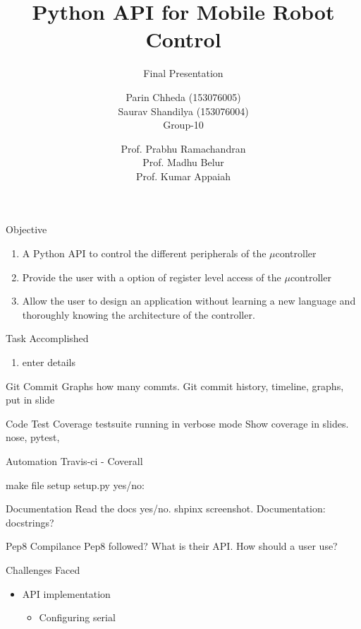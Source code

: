 \documentclass[10pt,handout,english]{beamer}
\title[] %
{Python API for Mobile Robot Control}
\subtitle{Final Presentation}
\author[AE-663 Course Project 2016-17] %
{Parin Chheda (153076005) \\ Saurav Shandilya (153076004) \\ Group-10 }
\institute [Indian Institute of Technology Bombay]%
{
  
}
\date[\today] %
{Prof. Prabhu Ramachandran \\ Prof. Madhu Belur \\ Prof. Kumar Appaiah}
\begin{document}
 
\frame{\titlepage}

\begin{frame}{Objective}
\begin{enumerate}
	\item A Python API to control the different peripherals of the ${\mu}$controller
	\item Provide the user with a option of register level access of the ${\mu}$controller
	\item Allow the user to design an application without learning a new language and thoroughly knowing the architecture of the controller.
\end{enumerate}
\end{frame}

\begin{frame}{Task Accomplished}

\begin{enumerate}
	\item enter details

\end{enumerate}

\end{frame}

\begin{frame}{Git Commit Graphs}
how many commts.
  Git commit history, timeline, graphs, put in slide

\end{frame}

\begin{frame}{Code Test Coverage}
	testsuite running in verbose mode
	    Show coverage in slides.
	    nose, pytest,
\end{frame}

\begin{frame}{Automation}
Travis-ci - 
Coverall

make file
    setup
    setup.py yes/no:

\end{frame}

\begin{frame}{Documentation}
Read the docs yes/no.
    shpinx screenshot.
    Documentation:
    docstrings?

\end{frame}


\begin{frame}{Pep8 Compilance}
	Pep8 followed?
    What is their API.
    How should a user use?
\end{frame}

\begin{frame}{Challenges Faced}
	\begin{itemize}
		\item API implementation
			\begin{itemize}
				\item Configuring serial 
			\end{itemize}
	\end{itemize}
	
\end{frame}
\end{document}
